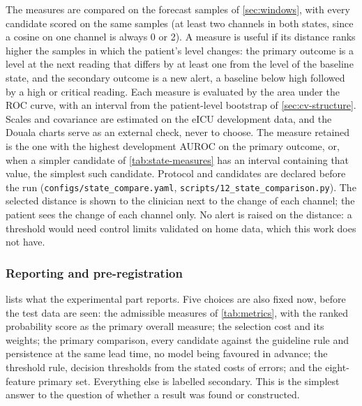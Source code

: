 The measures are compared on the forecast samples of \cref{sec:windows}, with every candidate scored on the same samples (at least two channels in both states, since a cosine on one channel is always 0 or 2). A measure is useful if its distance ranks higher the samples in which the patient's level changes: the primary outcome is a level at the next reading that differs by at least one from the level of the baseline state, and the secondary outcome is a new alert, a baseline below high followed by a high or critical reading. Each measure is evaluated by the area under the ROC curve, with an interval from the patient-level bootstrap of \cref{sec:cv-structure}. Scales and covariance are estimated on the eICU development data, and the Douala charts serve as an external check, never to choose. The measure retained is the one with the highest development AUROC on the primary outcome, or, when a simpler candidate of \cref{tab:state-measures} has an interval containing that value, the simplest such candidate. Protocol and candidates are declared before the run (\texttt{configs/state\_compare.yaml}, \texttt{scripts/12\_state\_comparison.py}). The selected distance is shown to the clinician next to the change of each channel; the patient sees the change of each channel only. No alert is raised on the distance: a threshold would need control limits validated on home data, which this work does not have.

\subsubsection{Reporting and pre-registration}\label{sec:reporting-prereg}\label{sec:prereg}\label{sec:reporting}

 lists what the experimental part reports. Five choices are also fixed now, before the test data are seen: the admissible measures of \cref{tab:metrics}, with the ranked probability score as the primary overall measure; the selection cost and its weights; the primary comparison, every candidate against the guideline rule and persistence at the same lead time, no model being favoured in advance; the threshold rule, decision thresholds from the stated costs of errors; and the eight-feature primary set. Everything else is labelled secondary. This is the simplest answer to the question of whether a result was found or constructed.

